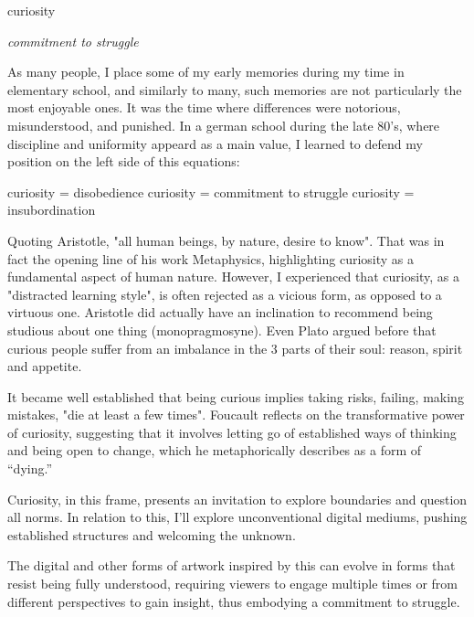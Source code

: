 


\begin{center}
\vspace*{\fill}
\Huge curiosity

\vspace{2cm}

\begin{flushright}
\large
\textit{commitment to struggle}
\end{flushright}

\vspace*{\fill}
\end{center}

\normalsize

As many people, I place some of my early memories during my time in elementary school, and similarly to many, such memories are not particularly the most enjoyable ones. It was the time where differences were notorious, misunderstood, and punished. In a german school during the late 80's, where discipline and uniformity appeard as a main value, I learned to defend my position on the left side of this equations: 

curiosity = disobedience
curiosity = commitment to struggle %
curiosity = insubordination

Quoting Aristotle, "all human beings, by nature, desire to know". That was in fact the opening line of his work Metaphysics, highlighting curiosity as a fundamental aspect of human nature.  However, I experienced that curiosity, as a "distracted learning style", is often rejected as a vicious form, as opposed to a virtuous one. Aristotle did actually have an inclination to recommend being studious about one thing (monopragmosyne). Even Plato argued before that curious people suffer from an imbalance in the 3 parts of their soul: reason, spirit and appetite. \citep{perry2020}

It became well established that being curious implies taking risks, failing, making mistakes, "die at least a few times". \citep{foucault1980masked} Foucault reflects on the transformative power of curiosity, suggesting that it involves letting go of established ways of thinking and being open to change, which he metaphorically describes as a form of “dying.”


Curiosity, in this frame, presents an invitation to explore boundaries and question all norms.
In relation to this, I'll explore unconventional digital mediums, pushing established structures and welcoming the unknown.

The digital and other forms of artwork inspired by this can evolve in forms that resist being fully understood, requiring viewers to engage multiple times or from different perspectives to gain insight, thus embodying a commitment to struggle.
